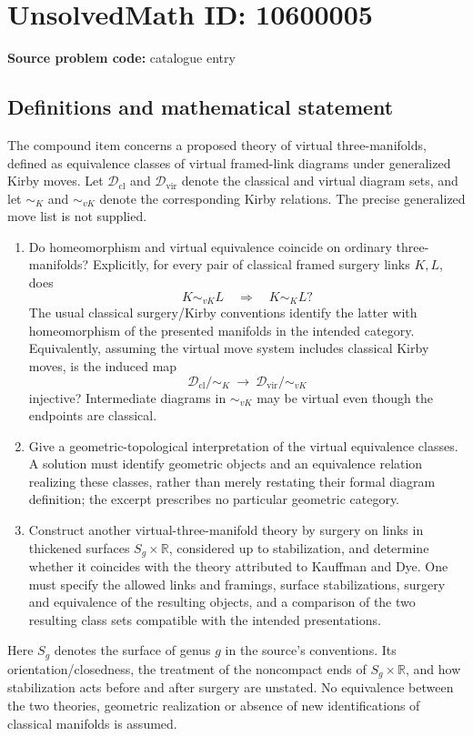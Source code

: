 \documentclass[11pt]{article}
\newcommand{\R}{\mathbb{R}}
\begin{document}
\section*{UnsolvedMath ID: 10600005}
\textbf{Source problem code:} catalogue entry
\subsection{Definitions and mathematical statement}
The compound item concerns a proposed theory of virtual three-manifolds, defined as equivalence classes of virtual framed-link diagrams under generalized Kirby moves. Let \(\mathcal D_{\mathrm{cl}}\) and \(\mathcal D_{\mathrm{vir}}\) denote the classical and virtual diagram sets, and let \(\sim_K\) and \(\sim_{vK}\) denote the corresponding Kirby relations. The precise generalized move list is not supplied.
\begin{enumerate}
\item Do homeomorphism and virtual equivalence coincide on ordinary three-manifolds? Explicitly, for every pair of classical framed surgery links \(K,L\), does
\[K\sim_{vK}L\quad\Longrightarrow\quad K\sim_K L?\]
The usual classical surgery/Kirby conventions identify the latter with homeomorphism of the presented manifolds in the intended category. Equivalently, assuming the virtual move system includes classical Kirby moves, is the induced map
\[\mathcal D_{\mathrm{cl}}/\!\sim_K\ \longrightarrow\ \mathcal D_{\mathrm{vir}}/\!\sim_{vK}\]
injective? Intermediate diagrams in \(\sim_{vK}\) may be virtual even though the endpoints are classical.
\item Give a geometric-topological interpretation of the virtual equivalence classes. A solution must identify geometric objects and an equivalence relation realizing these classes, rather than merely restating their formal diagram definition; the excerpt prescribes no particular geometric category.
\item Construct another virtual-three-manifold theory by surgery on links in thickened surfaces \(S_g\times\R\), considered up to stabilization, and determine whether it coincides with the theory attributed to Kauffman and Dye. One must specify the allowed links and framings, surface stabilizations, surgery and equivalence of the resulting objects, and a comparison of the two resulting class sets compatible with the intended presentations.
\end{enumerate}
Here \(S_g\) denotes the surface of genus \(g\) in the source's conventions. Its orientation/closedness, the treatment of the noncompact ends of \(S_g\times\R\), and how stabilization acts before and after surgery are unstated. No equivalence between the two theories, geometric realization or absence of new identifications of classical manifolds is assumed.
\end{document}
